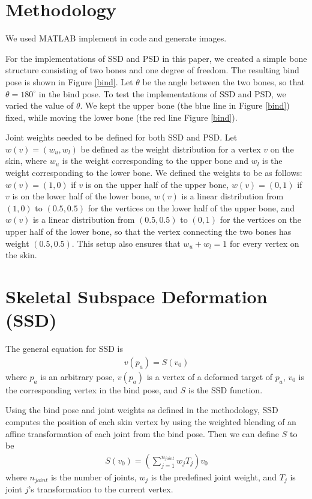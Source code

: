 \documentclass[11pt,twocolumn,letterpaper]{article}
\begin{document}
\section{Methodology}

We used MATLAB implement in code and generate images.

For the implementations of SSD and PSD in this paper, we created a simple bone structure consisting of two bones and one degree of freedom. The resulting bind pose is shown in Figure \ref{bind}. Let $\theta$ be the angle between the two bones, so that $\theta = 180^{\circ}$ in the bind pose. To test the implementations of SSD and PSD, we varied the value of $\theta$. We kept the upper bone (the blue line in Figure \ref{bind}) fixed, while moving the lower bone (the red line Figure \ref{bind}).

Joint weights needed to be defined for both SSD and PSD. Let $w(v) = (w_u, w_l)$ be defined as the weight distribution for a vertex $v$ on the skin, where $w_u$ is the weight corresponding to the upper bone and $w_l$ is the weight corresponding to the lower bone. We defined the weights to be as follows: $w(v) = (1,0)$ if $v$ is on the upper half of the upper bone, $w(v) = (0,1)$ if $v$ is on the lower half of the lower bone, $w(v)$ is a linear distribution from $(1,0)$ to $(0.5,0.5)$ for the vertices on the lower half of the upper bone, and $w(v)$ is a linear distribution from $(0.5,0.5)$ to $(0,1)$ for the vertices on the upper half of the lower bone, so that the vertex connecting the two bones has weight $(0.5,0.5)$. This setup also ensures that $w_u + w_l = 1$ for every vertex on the skin.

\section{Skeletal Subspace Deformation (SSD)}

The general equation for SSD is
\begin{align} v(p_a) = S(v_0) \end{align}
where $p_a$ is an arbitrary pose, $v(p_a)$ is a vertex of a deformed target of $p_a$, $v_0$ is the corresponding vertex in the bind pose, and $S$ is the SSD function.

Using the bind pose and joint weights as defined in the methodology, SSD computes the position of each skin vertex by using the weighted blending of an affine transformation of each joint from the bind pose. Then we can define $S$ to be
\begin{align} S(v_0) = (\sum_{j=1}^{n_{joint}} w_j T_j) v_0 
\label{ssd_eq}
\end{align}
where $n_{joint}$ is the number of joints, $w_j$ is the predefined joint weight, and $T_j$ is joint $j$'s transformation to the current vertex.
\end{document}
